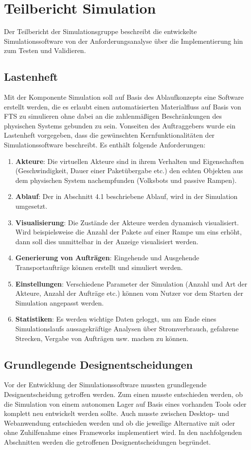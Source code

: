 \section{Teilbericht Simulation}
Der Teilbericht der Simulationsgruppe beschreibt die entwickelte Simulationssoftware von der Anforderungsanalyse über die Implementierung hin zum Testen und Validieren. 
\subsection{Lastenheft}
Mit der Komponente Simulation soll auf Basis des Ablaufkonzepts eine Software erstellt werden, die es erlaubt einen automatisierten Materialfluss auf Basis von FTS zu simulieren ohne dabei an die zahlenmäßigen Beschränkungen des physischen Systems gebunden zu sein. Vonseiten des Auftraggebers wurde ein Lastenheft vorgegeben, dass die gewünschten Kernfunktionalitäten der Simulationssoftware beschreibt. Es enthält folgende Anforderungen:
\begin{enumerate}
\item \textbf{Akteure}: Die virtuellen Akteure sind in ihrem Verhalten und Eigenschaften (Geschwindigkeit, Dauer einer Paketübergabe etc.) den echten Objekten aus dem physischen System nachempfunden (Volksbots und passive Rampen).
\item \textbf{Ablauf}: Der in Abschnitt 4.1 beschriebene Ablauf, wird in der Simulation umgesetzt. 
\item \textbf{Visualisierung}: Die Zustände der Akteure werden dynamisch visualisiert. Wird beispielsweise die Anzahl der Pakete auf einer Rampe um eins erhöht, dann soll dies unmittelbar in der Anzeige visualisiert werden.
\item \textbf{Generierung von Aufträgen}: Eingehende und Ausgehende Transportaufträge können erstellt und simuliert werden. 
\item \textbf{Einstellungen}: Verschiedene Parameter der Simulation (Anzahl und Art der Akteure, Anzahl der Aufträge etc.) können vom Nutzer vor dem Starten der Simulation angepasst werden.
\item \textbf{Statistiken}: Es werden wichtige Daten geloggt, um am Ende eines Simulationslaufs aussagekräftige Analysen über Stromverbrauch, gefahrene Strecken, Vergabe von Aufträgen usw. machen zu können.
\end{enumerate}
\subsection{Grundlegende Designentscheidungen}
Vor der Entwicklung der Simulationssoftware mussten grundlegende Designentscheidung getroffen werden. Zum einen musste entschieden werden, ob die Simulation von einem autonomen Lager auf Basis eines vorhanden Tools oder komplett neu entwickelt werden sollte. Auch musste zwischen Desktop- und Webanwendung entschieden werden und ob die jeweilige Alternative mit oder ohne Zuhilfenahme eines Frameworks implementiert wird. In den nachfolgenden Abschnitten werden die getroffenen Designentscheidungen begründet.
